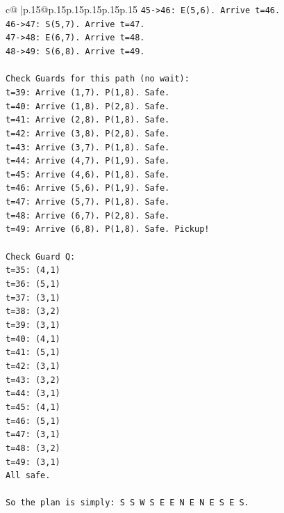 \documentclass{article}
\begin{document}
{\begin{supertabular}{c@{$\;$}|p{.15\linewidth}@{}p{.15\linewidth}p{.15\linewidth}p{.15\linewidth}p{.15\linewidth}p{.15\linewidth}}
{{{\texttt{45{-}>46: E(5,6). Arrive t=46.} \\
\texttt{46{-}>47: S(5,7). Arrive t=47.} \\
\texttt{47{-}>48: E(6,7). Arrive t=48.} \\
\texttt{48{-}>49: S(6,8). Arrive t=49.} \\
\\ 
\texttt{Check Guards for this path (no wait):} \\
\texttt{t=39: Arrive (1,7). P(1,8). Safe.} \\
\texttt{t=40: Arrive (1,8). P(2,8). Safe.} \\
\texttt{t=41: Arrive (2,8). P(1,8). Safe.} \\
\texttt{t=42: Arrive (3,8). P(2,8). Safe.} \\
\texttt{t=43: Arrive (3,7). P(1,8). Safe.} \\
\texttt{t=44: Arrive (4,7). P(1,9). Safe.} \\
\texttt{t=45: Arrive (4,6). P(1,8). Safe.} \\
\texttt{t=46: Arrive (5,6). P(1,9). Safe.} \\
\texttt{t=47: Arrive (5,7). P(1,8). Safe.} \\
\texttt{t=48: Arrive (6,7). P(2,8). Safe.} \\
\texttt{t=49: Arrive (6,8). P(1,8). Safe. Pickup!} \\
\\ 
\texttt{Check Guard Q:} \\
\texttt{t=35: (4,1)} \\
\texttt{t=36: (5,1)} \\
\texttt{t=37: (3,1)} \\
\texttt{t=38: (3,2)} \\
\texttt{t=39: (3,1)} \\
\texttt{t=40: (4,1)} \\
\texttt{t=41: (5,1)} \\
\texttt{t=42: (3,1)} \\
\texttt{t=43: (3,2)} \\
\texttt{t=44: (3,1)} \\
\texttt{t=45: (4,1)} \\
\texttt{t=46: (5,1)} \\
\texttt{t=47: (3,1)} \\
\texttt{t=48: (3,2)} \\
\texttt{t=49: (3,1)} \\
\texttt{All safe.} \\
\\ 
\texttt{So the plan is simply: S S W S E E N E N E S E S.} \\
}}}
\end{supertabular}}
\end{document}
